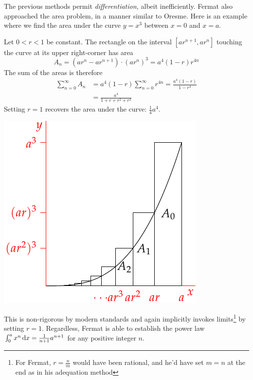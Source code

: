 
The previous methods permit \emph{differentiation,} albeit inefficiently. Fermat also approached the area problem, in a manner similar to Oresme. Here is an example where we find the area under the curve $y=x^3$ between $x=0$ and $x=a$.

\begin{minipage}[t]{0.59\linewidth}\vspace{0pt}
	Let $0<r<1$ be constant. The rectangle on the interval $[ar^{n+1},ar^n]$ touching the curve at its upper right-corner has area
	\[
		A_n=(ar^n-ar^{n+1})\cdot (ar^n)^3=a^4(1-r)r^{4n}
	\]
	The sum of the areas is therefore
	\begin{align*}
		\sum_{n=0}^\infty A_n&=a^4(1-r)\sum_{n=0}^\infty r^{4n}=\frac{a^4(1-r)}{1-r^4}\\
		&=\frac{a^4}{1+r+r^2+r^3}
	\end{align*}
	Setting $r=1$ recovers the area under the curve: $\frac 14a^4$.
\end{minipage}
\hfill
\begin{minipage}[t]{0.4\linewidth}\vspace{0pt}
	\flushright\includegraphics{analytic-fermat-area}
\end{minipage}
\medbreak

This is non-rigorous by modern standards and again implicitly invokes limits\footnote{%
	For Fermat, $r=\frac nm$ would have been rational, and he'd have set $m=n$ at the end as in his adequation method
}
by setting $r=1$. Regardless, Fermat is able to establish the power law $\int_0^a x^n\,{\mathrm{d} x}=\frac 1{n+1}a^{n+1}$ for any positive integer $n$.


